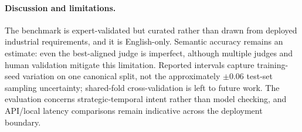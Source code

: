 \paragraph{Discussion and limitations.}
The benchmark is expert-validated but curated rather than drawn from deployed industrial requirements, and it is English-only. Semantic accuracy remains an estimate: even the best-aligned judge is imperfect, although multiple judges and human validation mitigate this limitation. Reported intervals capture training-seed variation on one canonical split, not the approximately $\pm0.06$ test-set sampling uncertainty; shared-fold cross-validation is left to future work. The evaluation concerns strategic-temporal intent rather than model checking, and API/local latency comparisons remain indicative across the deployment boundary.




